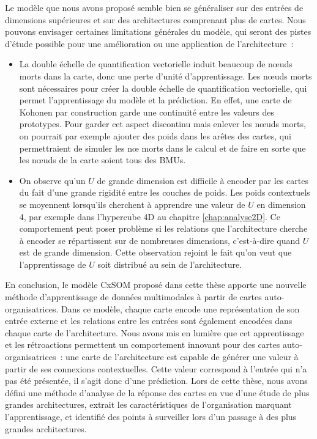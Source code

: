 Le modèle que nous avons proposé semble bien se généraliser sur des entrées de dimensions supérieures et sur des architectures comprenant plus de cartes.
Nous pouvons envisager certaines limitations générales du modèle, qui seront des pistes d'étude possible pour une amélioration ou une application de l'architecture~: 
\begin{itemize}
    \item La double échelle de quantification vectorielle induit beaucoup de n\oe{}uds morts dans la carte, donc une perte d'unité d'apprentissage. Les n\oe{}uds morts sont nécessaires pour créer la double échelle de quantification vectorielle, qui permet l'apprentissage du modèle et la prédiction. En effet, une carte de Kohonen par construction garde une continuité entre les valeurs des prototypes.
    Pour garder cet aspect discontinu mais enlever les n\oe{}uds morts, on pourrait par exemple ajouter des poids dans les arêtes des cartes, qui permettraient de simuler les n\oe{} morts dans le calcul et de faire en sorte que les n\oe{}uds de la carte soient tous des BMUs.
    \item On observe qu'un $U$ de grande dimension est difficile à encoder par les cartes du fait d'une grande rigidité entre les couches de poids. Les poids contextuels se moyennent lorsqu'ils cherchent à apprendre une valeur de $U$ en dimension 4, par exemple dans l'hypercube 4D au chapitre \ref{chap:analyse2D}. Ce comportement peut poser problème si les relations que l'architecture cherche à encoder se répartissent sur de nombreuses dimensions, c'est-à-dire quand $U$ est de grande dimension. Cette observation rejoint le fait qu'on veut que l'apprentissage de $U$ soit distribué au sein de l'architecture.
\end{itemize}

En conclusion, le modèle CxSOM proposé dans cette thèse apporte une nouvelle méthode d'apprentissage de données multimodales à partir de cartes auto-organisatrices. 
Dans ce modèle, chaque carte encode une représentation de son entrée externe et les relations entre les entrées sont également encodées dans chaque carte de l'architecture. 
Nous avons mis en lumière que cet apprentissage et les rétroactions permettent un comportement innovant pour des cartes auto-organisatrices~: une carte de l'architecture est capable de générer une valeur à partir de ses connexions contextuelles. Cette valeur correspond à l'entrée qui n'a pas été présentée, il s'agit donc d'une prédiction.
Lors de cette thèse, nous avons défini une méthode d'analyse de la réponse des cartes en vue d'une étude de plus grandes architectures, extrait les caractéristiques de l'organisation marquant l'apprentissage, et identifié des points à surveiller lors d'un passage à des plus grandes architectures.

